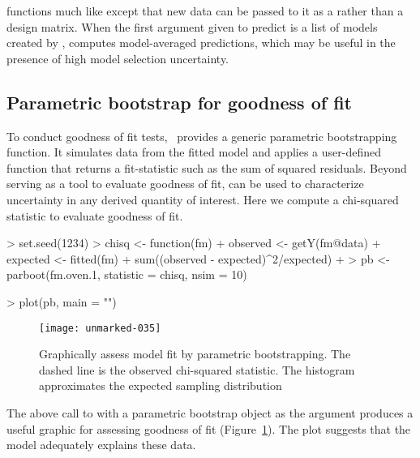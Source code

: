 \documentclass[article,shortnames]{jss}
\newcommand{\um}{\pkg{unmarked}}
\begin{document}
 functions much like  except that new data can be
passed to it as a  rather than a design matrix. When the first 
argument given to predict is a list of models created by , 
 computes model-averaged predictions, which may be
useful in the presence of high model selection uncertainty.  




\subsection{Parametric bootstrap for goodness of fit}

To conduct goodness of fit tests, \um\ provides a generic parametric 
bootstrapping function.  It simulates data from the fitted model and 
applies a user-defined function that returns a fit-statistic such as the 
sum of squared residuals.  Beyond serving as a tool to evaluate goodness of fit,
 can be used to characterize uncertainty in any derived quantity 
of interest. Here we compute a chi-squared statistic to evaluate 
goodness of fit.

\begin{Schunk}
\begin{Sinput}
> set.seed(1234)
> chisq <- function(fm) {
+     observed <- getY(fm@data)
+     expected <- fitted(fm)
+     sum((observed - expected)^2/expected)
+ }
> pb <- parboot(fm.oven.1, statistic = chisq, nsim = 10)
\end{Sinput}
\end{Schunk}

\begin{Schunk}
\begin{Sinput}
> plot(pb, main = "")
\end{Sinput}
\end{Schunk}

\begin{figure}[H]
  \centering
\texttt{[image: unmarked-035]}
\caption{Graphically assess model fit by parametric bootstrapping.  The dashed 
line is the observed chi-squared statistic. The histogram approximates the 
expected sampling distribution}
\label{fig:pb}
\end{figure}


The above call to  with a parametric bootstrap object as
the argument produces a useful graphic for assessing goodness of fit
(Figure~\ref{fig:pb}).  The plot suggests that the model adequately  
explains these data.
\end{document}
